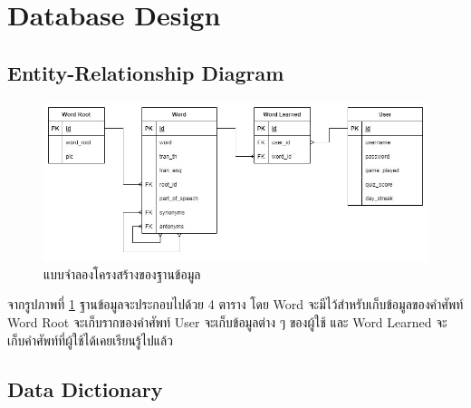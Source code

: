 \documentclass[12pt,oneside,openright,a4paper]{cpe-thai-project}
\begin{document}
\pagebreak
\section{Database Design}
\subsection{Entity-Relationship Diagram}
\begin{figure}[!h]\centering
	\includegraphics[width=\textwidth, keepaspectratio=true]{image/chap3/ER diagrams.jpg}
	\caption{แบบจำลองโครงสร้างของฐานข้อมูล}\label{fig:ERDiagram}
\end{figure}
\hspace{1cm}
จากรูปภาพที่ \ref{fig:ERDiagram} ฐานข้อมูลจะประกอบไปด้วย 4 ตาราง โดย Word จะมีไว้สำหรับเก็บข้อมูลของคำศัพท์ Word Root
จะเก็บรากของคำศัพท์ User จะเก็บข้อมูลต่าง ๆ ของผู้ใช้ และ Word Learned จะเก็บคำศัพท์ที่ผู้ใช้ได้เคยเรียนรู้ไปแล้ว

\pagebreak
\subsection{Data Dictionary}
\end{document}
